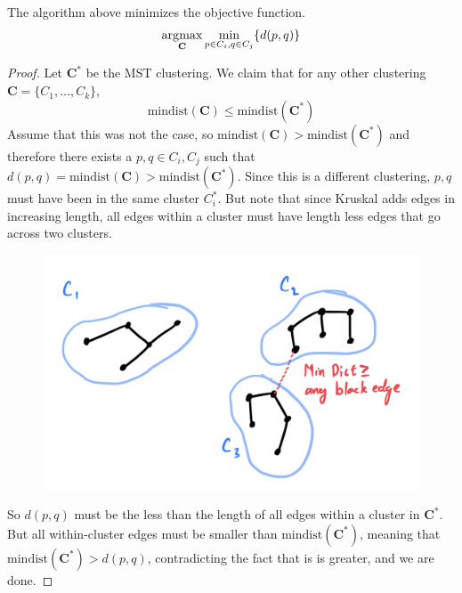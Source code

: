   \begin{theorem}
    The algorithm above minimizes the objective function. 
    \begin{equation}
      \argmax_{\mathbf{C}} \min_{p \in C_i, q \in C_j} \{ d(p, q) \}
    \end{equation}
  \end{theorem}
  \begin{proof}
    Let $\mathbf{C}^\ast$ be the MST clustering. We claim that for any other clustering $\mathbf{C} = \{C_1, \ldots, C_k\}$,  
    \begin{equation}
      \mathrm{min dist}(\mathbf{C}) \leq \mathrm{min dist}(\mathbf{C}^{\ast})
    \end{equation}
    Assume that this was not the case, so $\mathrm{min dist}(\mathbf{C}) > \mathrm{min dist}(\mathbf{C}^{\ast})$ and therefore there exists a $p, q \in C_i, C_j$ such that $d(p, q) = \mathrm{mindist}(\mathbf{C}) > \mathrm{min dist}(\mathbf{C}^\ast)$. Since this is a different clustering, $p, q$ must have been in the same cluster $C_i^\ast$. But note that since Kruskal adds edges in increasing length, all edges within a cluster must have length less edges that go across two clusters. 

    \begin{figure}[H]
      \centering 
      \includegraphics[scale=0.4]{img/mindist.png}
      \label{fig:mindist}
    \end{figure}

    So $d(p, q)$ must be the less than the length of all edges within a cluster in $\mathbf{C}^\ast$. But all within-cluster edges must be smaller than $\mathrm{min dist}(\mathbf{C}^\ast)$, meaning that $\mathrm{min dist}(\mathbf{C}^\ast) > d(p, q)$, contradicting the fact that is is greater, and we are done. 
  \end{proof}

